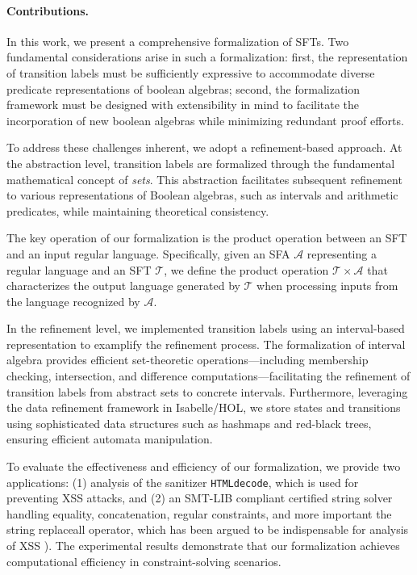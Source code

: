 \paragraph{Contributions.} 
In this work, we present a comprehensive formalization of SFTs. 
Two fundamental considerations arise in such a formalization: first, the 
representation of transition labels must be sufficiently expressive to accommodate diverse predicate representations of boolean algebras; second, the formalization framework must be designed with extensibility in mind to facilitate the incorporation of new boolean algebras while minimizing redundant proof efforts.

To address these challenges inherent, %
we adopt a refinement-based approach. At the abstraction level, transition labels are formalized through the fundamental mathematical concept of \emph{sets}. This abstraction facilitates subsequent refinement to various representations of Boolean algebras, such as intervals and arithmetic predicates, while maintaining theoretical consistency.

The key operation of our formalization is the product operation between an SFT and an input regular language. Specifically, given an SFA $\mathcal{A}$ representing a regular language and an SFT $\mathcal{T}$, we define the product operation $\mathcal{T} \times\mathcal{A}$ that characterizes the output language generated by $\mathcal{T}$ when processing inputs from the language recognized by $\mathcal{A}$.


In the refinement level, we implemented transition labels using an interval-based representation to examplify the refinement process. The formalization of interval algebra provides efficient set-theoretic operations—including membership checking, intersection, and difference computations—facilitating the refinement of transition labels from abstract sets to concrete intervals. Furthermore, leveraging the data refinement framework \cite{DBLP:conf/itp/Lammich13} in Isabelle/HOL, we store states and transitions using sophisticated data structures such as hashmaps and red-black trees, ensuring efficient automata manipulation.

To evaluate the effectiveness and efficiency of our formalization, we 
provide two applications: (1) analysis of the sanitizer \texttt{HTMLdecode},
which is used for preventing XSS attacks, and (2) an SMT-LIB \cite{smtlib}
compliant certified string solver handling equality, concatenation, regular
constraints, and more important the string replaceall operator, which has been
argued to be indispensable for analysis of XSS 
\cite{DBLP:conf/popl/LinB16,Kern,Berkeley-JavaScript,DBLP:conf/sp/SaxenaAHMMS10,uss/HooimeijerLMSV11}).
The experimental results demonstrate that our formalization achieves computational efficiency in constraint-solving scenarios.


